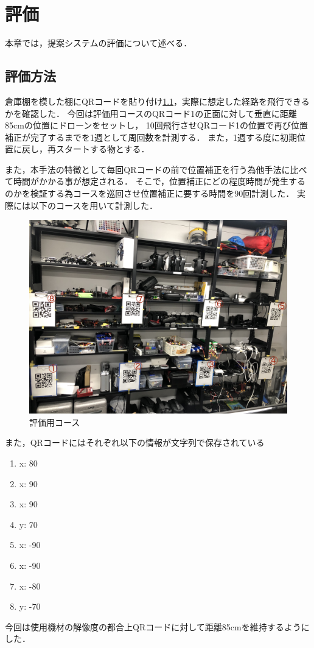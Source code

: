 \chapter{評価}
\label{evaluation}
本章では，提案システムの評価について述べる．

\section{評価方法}
倉庫棚を模した棚にQRコードを貼り付け\ref{course}，実際に想定した経路を飛行できるかを確認した．
今回は評価用コースのQRコード1の正面に対して垂直に距離85cmの位置にドローンをセットし，
10回飛行させQRコード1の位置で再び位置補正が完了するまでを1週として周回数を計測する．
また，1週する度に初期位置に戻し，再スタートする物とする．

また，本手法の特徴として毎回QRコードの前で位置補正を行う為他手法に比べて時間がかかる事が想定される．
そこで，位置補正にどの程度時間が発生するのかを検証する為コースを巡回させ位置補正に要する時間を90回計測した．
実際には以下のコースを用いて計測した．


\begin{figure}[htbp]
  \begin{center}
    \includegraphics[clip,width=15.0cm]{img/course.jpg}
    \caption{評価用コース}
    \label{course}
  \end{center}
\end{figure}

また，QRコードにはそれぞれ以下の情報が文字列で保存されている
\begin{enumerate}
    \item {x: 80}
    \item {x: 90}
    \item {x: 90}
    \item {y: 70}
    \item {x: -90}
    \item {x: -90}
    \item {x: -80}
    \item {y: -70}
\end{enumerate}

今回は使用機材の解像度の都合上QRコードに対して距離85cmを維持するようにした．



